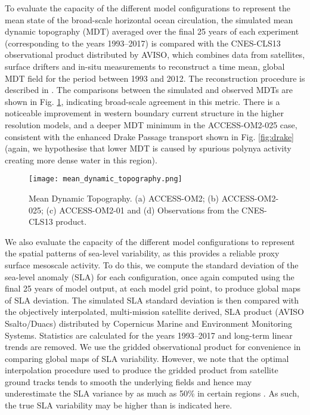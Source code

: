 \documentclass[gmd, manuscript]{copernicus}
\begin{document}
To evaluate the capacity of the different model configurations to represent the mean state of the broad-scale horizontal ocean circulation, the simulated mean dynamic topography (MDT) averaged over the final 25 years of each experiment (corresponding to the years 1993--2017) is compared with the CNES-CLS13 observational product distributed by AVISO, which combines data from satellites, surface drifters and in-situ measurements to reconstruct a time mean, global MDT field for the period between 1993 and 2012. 
The reconstruction procedure is described in \citet{Rio2011}. 
The comparisons between the simulated and observed MDTs are shown in Fig. \ref{fig:mdt}, indicating broad-scale agreement in this metric.
There is a noticeable improvement in western boundary current structure in the higher resolution models, and a deeper MDT minimum in the ACCESS-OM2-025 case, consistent with the enhanced Drake Passage transport shown in Fig. \ref{fig:drake} (again, we hypothesise that lower MDT is caused by spurious polynya activity creating more dense water in this region).


\begin{figure}[t]
\texttt{[image: mean\_dynamic\_topography.png]}
\caption{Mean Dynamic Topography. (a) ACCESS-OM2; (b) ACCESS-OM2-025; (c) ACCESS-OM2-01 and (d) Observations from the CNES-CLS13 product. 
\label{fig:mdt}}
\end{figure}

We also evaluate the capacity of the different model configurations to represent the spatial patterns of sea-level variability, as this provides a reliable proxy surface mesoscale activity. 
To do this, we compute the standard deviation of the sea-level anomaly (SLA) for each configuration, once again computed using the final 25 years of model output, at each model grid point, to produce global maps of SLA deviation. 
The simulated SLA standard deviation is then compared with the objectively interpolated, multi-mission satellite derived, SLA product (AVISO Ssalto/Duacs) distributed by Copernicus Marine and Environment Monitoring Systems. 
Statistics are calculated for the years 1993--2017 and long-term linear trends are removed. 
We use the gridded observational product for convenience in comparing global maps of SLA variability. 
However, we note that the optimal interpolation procedure used to produce the gridded product from satellite ground tracks tends to smooth the underlying fields and hence may underestimate the SLA variance by as much as 50\% in certain regions \citep{Chambers2018}. 
As such, the true SLA variability may be higher than is indicated here. 
\end{document}
